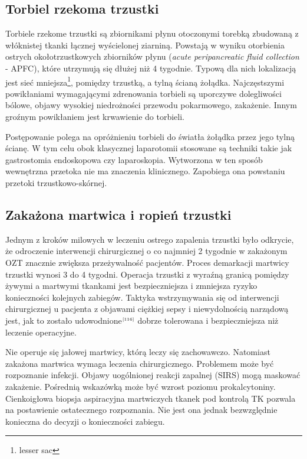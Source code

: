 \documentclass[a4paper, 12pt]{report}
\newcommand\cyt[1]{$^{\tiny{\cite{#1}}}$}
\begin{document}
\subsection*{Torbiel rzekoma trzustki}

Torbiele rzekome trzustki są zbiornikami płynu otoczonymi torebką
zbudowaną z włóknistej tkanki łącznej wyścielonej ziarniną. Powstają w
wyniku otorbienia ostrych okołotrzustkowych zbiorników płynu
(\textsl{acute peripancreatic fluid collection} - APFC), które
utrzymują się dłużej niż 4 tygodnie. Typową dla nich lokalizacją jest
sieć mniejsza\footnote{lesser sac}, pomiędzy trzustką, a tylną ścianą
żołądka. Najczęstszymi powikłaniami wymagającymi zdrenowania torbieli są
uporczywe dolegliwości bólowe, objawy wysokiej niedrożności przewodu
pokarmowego, zakażenie. Innym groźnym powikłaniem jest krwawienie do
torbieli.

Postępowanie polega na opróżnieniu torbieli do światła żołądka przez
jego tylną ścianę. W tym celu obok klasycznej laparotomii stosowane są
techniki takie jak gastrostomia endoskopowa czy
laparoskopia. Wytworzona w ten sposób wewnętrzna przetoka nie ma
znaczenia klinicznego. Zapobiega ona powstaniu przetoki trzustkowo-skórnej.

\subsection*{Zakażona martwica i ropień trzustki}

Jednym z kroków milowych w leczeniu ostrego zapalenia trzustki było
odkrycie, że odroczenie interwencji chirurgicznej o co najmniej 2
tygodnie w zakażonym OZT znacznie zwiększa przeżywalność
pacjentów. Proces demarkacji martwicy trzustki wynosi 3 do 4
tygodni. Operacja trzustki z wyraźną granicą pomiędzy żywymi a
martwymi tkankami jest bezpieczniejsza i zmniejsza ryzyko konieczności
kolejnych zabiegów. Taktyka wstrzymywania się od interwencji
chirurgicznej u pacjenta z objawami ciężkiej sepsy i niewydolnością
narządową jest, jak to zostało udowodnione\cyt{116} dobrze tolerowana
i bezpieczniejsza niż leczenie operacyjne.

Nie operuje się jałowej martwicy, którą leczy się
zachowawczo. Natomiast zakażona martwica wymaga leczenia
chirurgicznego. Problemem może być rozpoznanie infekcji. Objawy
uogólnionej reakcji zapalnej (SIRS) mogą maskować zakażenie. Pośrednią
wskazówką może być wzrost poziomu prokalcytoniny. Cienkoigłowa
biopsja aspiracyjna martwiczych tkanek pod kontrolą TK pozwala na
postawienie ostatecznego rozpoznania. Nie jest ona jednak bezwzględnie
konieczna do decyzji o konieczności zabiegu.
\end{document}
